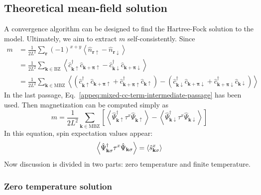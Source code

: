 \subsection{Theoretical mean-field solution}

A convergence algorithm can be designed to find the Hartree-Fock solution to the model. Ultimately, we aim to extract $m$ self-consistently. Since
\[
\begin{aligned}
	m &= \frac{1}{2L^2} \sum_\mathbf{r} (-1)^{x+y} \left\langle
		\hat n_{\mathbf{r}\uparrow} - \hat n_{\mathbf{r}\downarrow}
	\right\rangle \\
	&= \frac{1}{2L^2} \sum_{\mathbf{k} \in \mathrm{BZ}} \left\langle
		\hat c_{\mathbf{k}\uparrow}^\dagger \hat c_{\mathbf{k}+\bm{\pi}\uparrow} - \hat c_{\mathbf{k}\downarrow}^\dagger \hat c_{\mathbf{k}+\bm{\pi}\downarrow}
	\right\rangle \\
	&= \frac{1}{2L^2} \sum_{\mathbf{k} \in \mathrm{MBZ}} \left\langle
			\left(
				\hat c_{\mathbf{k}\uparrow}^\dagger \hat c_{\mathbf{k}+\bm{\pi}\uparrow} + \hat c_{\mathbf{k}+\bm{\pi}\uparrow}^\dagger \hat c_{\mathbf{k}\uparrow}	
			\right) - \left(
				\hat c_{\mathbf{k}\downarrow}^\dagger \hat c_{\mathbf{k}+\bm{\pi}\downarrow} + \hat c_{\mathbf{k}+\bm{\pi}\downarrow}^\dagger \hat c_{\mathbf{k}\downarrow}	
			\right)
		\right\rangle
\end{aligned}
\]
In the last passage, Eq.~\eqref{appeq:mixed-cc-term-intermediate-passage} has been used. Then magnetization can be computed simply as
\begin{equation}\label{appeq:antiferromagnet-magnetization-self-consistence-abstract}
	m = \frac{1}{2L^2} \sum_{\mathbf{k} \in \mathrm{MBZ}} \left[
		\left\langle 
			\hat \Psi_{\mathbf{k}\uparrow}^\dagger \tau^x \hat \Psi_{\mathbf{k}\uparrow}
		\right\rangle - \left\langle 
			\hat \Psi_{\mathbf{k}\downarrow}^\dagger \tau^x \hat \Psi_{\mathbf{k}\downarrow}
		\right\rangle
	\right]
\end{equation}
In this equation, spin expectation values appear:
\[
	\left\langle 
		\hat \Psi_{\mathbf{k}\sigma}^\dagger \tau^x \hat \Psi_{\mathbf{k}\sigma}
	\right\rangle = \ev{\hat s_{\mathbf{k}\sigma}^x}
\]
Now discussion is divided in two parts: zero temperature and finite temperature.

\subsubsection{Zero temperature solution}


